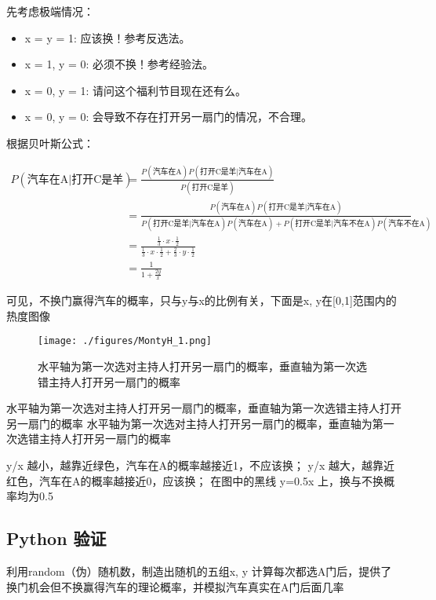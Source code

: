 先考虑极端情况：

\begin{itemize}
\item x = y = 1: 应该换！参考反选法。
\item x = 1, y = 0: 必须不换！参考经验法。
\item x = 0, y = 1: 请问这个福利节目现在还有么。
\item x = 0, y = 0: 会导致不存在打开另一扇门的情况，不合理。
\end{itemize}

根据贝叶斯公式：

\begin{align}
\nonumber
P(\text{汽车在A}|\text{打开C是羊})&=\frac{P(\text{汽车在A})P(\text{打开C是羊}|\text{汽车在A})}{P(\text{打开C是羊})}\\
\nonumber
&=\frac{P(\text{汽车在A})P(\text{打开C是羊}|\text{汽车在A})}{P(\text{打开C是羊}|\text{汽车在A})P(\text{汽车在A})+P(\text{打开C是羊}|\text{汽车不在A})P(\text{汽车不在A})}\\
\nonumber
&=\frac{\frac{1}{3}\cdot x\cdot \frac{1}{2}}{\frac{1}{3}\cdot x\cdot \frac{1}{2}+\frac{2}{3}\cdot y\cdot \frac{1}{2}}\\
\nonumber
&=\frac{1}{1+\frac{2y}{x}}
\end{align}

可见，不换门赢得汽车的概率，只与y与x的比例有关，下面是x, y在[0,1]范围内的热度图像

\begin{figure}[ht]
\centering
\texttt{[image: ./figures/MontyH\_1.png]}
\caption{水平轴为第一次选对主持人打开另一扇门的概率，垂直轴为第一次选错主持人打开另一扇门的概率} \label{MontyH_fig1}
\end{figure}

水平轴为第一次选对主持人打开另一扇门的概率，垂直轴为第一次选错主持人打开另一扇门的概率
水平轴为第一次选对主持人打开另一扇门的概率，垂直轴为第一次选错主持人打开另一扇门的概率

y/x 越小，越靠近绿色，汽车在A的概率越接近1，不应该换；
y/x 越大，越靠近红色，汽车在A的概率越接近0，应该换；
在图中的黑线 y=0.5x 上，换与不换概率均为0.5

\subsection{Python 验证}
利用random（伪）随机数，制造出随机的五组x, y 计算每次都选A门后，提供了换门机会但不换赢得汽车的理论概率，并模拟汽车真实在A门后面几率

